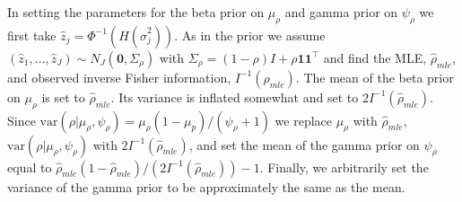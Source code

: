 \documentclass[12pt]{article}
\newcommand{\mb}{\mathbf}
\begin{document}
In setting the parameters for the beta prior on $\mu_{\rho}$ and gamma prior on  $\psi_\rho$ we first take $\hat z_{j}= \Phi^{-1} (H(\hat\sigma_{j}^{2}))$. As in the prior we assume $(\hat z_1,\dots,\hat z_J)\sim N_J(\mathbf{0}, \Sigma_\rho)$ with
$\Sigma_\rho=(1-\rho)I+\rho \mb{1}\mb{1}^{\top}$ and find the MLE, $\hat\rho_{mle}$, and observed inverse Fisher information, $I^{-1}(\rho_{mle})$. The mean of the beta prior on $\mu_{\rho}$ is set to $\hat\rho_{mle}$. Its variance is inflated somewhat and set to $2I^{-1}(\hat\rho_{mle})$. Since $\text{var}(\rho|\mu_{\rho}, \psi_{\rho})=\mu_{\rho} (1-\mu_{p})/(\psi_{\rho}+1)$ we replace $\mu_{\rho}$ with $\hat\rho_{mle}$, $\text{var}(\rho|\mu_{\rho}, \psi_{\rho})$ with $2I^{-1}(\hat\rho_{mle})$, and set the mean of the gamma prior on $\psi_{\rho}$ equal to $\hat\rho_{mle} (1-\hat\rho_{mle})/(2I^{-1}(\hat\rho_{mle}))-1$. Finally, we arbitrarily set the variance of the gamma prior to be approximately the same as the mean.

%




\end{document}
